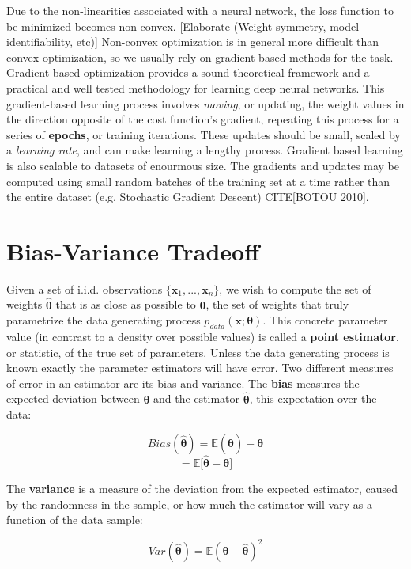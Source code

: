 Due to the non-linearities associated with a neural network, the loss function to be minimized becomes non-convex.
[Elaborate (Weight symmetry, model identifiability, etc)]
Non-convex optimization is in general more difficult than convex optimization, so we usually rely on gradient-based methods for the task.
Gradient based optimization provides a sound theoretical framework and a practical and well tested methodology for learning
deep neural networks. This gradient-based learning process involves \textit{moving},
or updating, the weight values in the direction opposite of the cost function's gradient, repeating this process for a series of
\textbf{epochs}, or training iterations.
These updates should be small, scaled by a
\textit{learning rate}, and can make learning a lengthy process. Gradient based learning is also scalable to datasets of enourmous size.
The gradients and updates may be computed using small random batches of the training set at a time rather than the entire dataset (e.g. Stochastic Gradient Descent) CITE[BOTOU 2010].

\section{Bias-Variance Tradeoff}

Given a set of i.i.d. observations $\{\bm{x}_1, ... , \bm{x}_n\}$, we wish to compute the set of weights $\bm{\hat{\theta}}$ that is as close
as possible to $\bm{\theta}$, the set of weights that truly parametrize the data generating process $p_{data}(\bm{x};\bm{\theta})$.
This concrete parameter value (in contrast to a density over possible values) is called a \textbf{point estimator}, or statistic, of the true
set of parameters.
Unless the data generating process is known exactly the parameter estimators will have error.
Two different measures of error in an estimator are its bias and variance.
The \textbf{bias} measures the expected deviation between $\bm{\theta}$ and the estimator $\bm{\hat{\theta}}$,
this expectation over the data:

\[Bias(\bm{\hat{\theta}}) = \mathbb{E}{(\bm{\hat{\theta}})} - \bm{\theta}\]
\[ = \mathbb{E}{[\bm{\hat{\theta}} - \bm{\theta}}]\]

The \textbf{variance} is a measure of the deviation from the expected estimator, caused by
the randomness in the sample, or how much the estimator will vary as a function of the data sample:

\[ Var(\bm{\hat{\theta}}) = \mathbb{E}{(\bm{\theta} - \bm{\hat{\theta}})^{2}}\]

